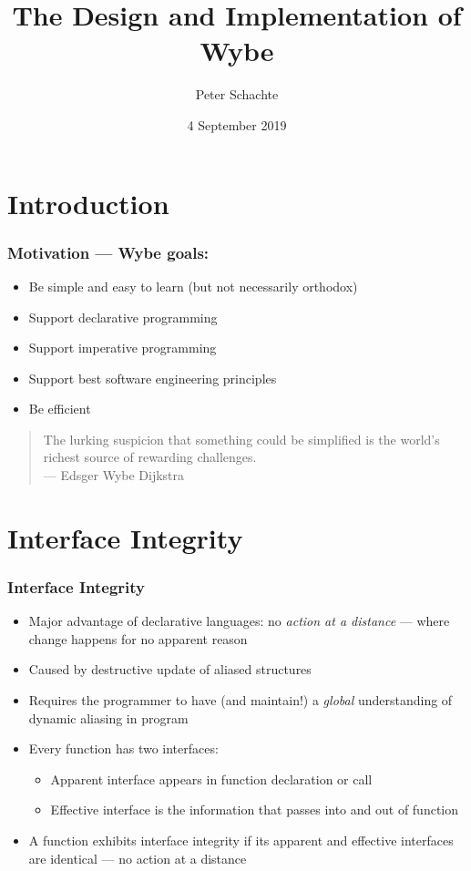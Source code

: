 \documentclass[12pt]{beamer}
\title[Introducing Wybe]{The Design and Implementation of Wybe}
\author[Peter Schachte]
{Peter Schachte}
\institute[Melbourne Uni]{The University of Melbourne \\ School of
  Computing and Information Systems}
\date{4 September 2019}
\begin{document}
\frame{\titlepage}

\section{Introduction}

\begin{frame}[fragile]
\frametitle{Motivation --- Wybe goals:}
\begin{itemize}
\item Be simple and easy to learn (but not necessarily orthodox)
\item Support declarative programming
\item Support imperative programming
\item Support best software engineering principles
\item Be efficient
\end{itemize}
\vspace{2ex}
\begin{quote}
  The lurking suspicion that something could be simplified is the
world's richest source of rewarding challenges. \\
\hspace*{1cm} --- Edsger Wybe Dijkstra
\end{quote}
\end{frame}

\section{Interface Integrity}

\begin{frame}[fragile]
\frametitle{Interface Integrity}
\begin{itemize}
\item Major advantage of declarative languages:  
  no \emph{action at a distance} --- where change happens for no apparent reason
\item Caused by destructive update of aliased structures
\item Requires the programmer to have (and maintain!) a \emph{global}
  understanding of dynamic aliasing in program
\item Every function has two interfaces:
  \begin{itemize}
  \item \alert<2>{Apparent interface} appears in function declaration
    or call
  \item \alert<3>{Effective interface} is the information that passes into and out of function
  \end{itemize}
\item A function exhibits \alert<4>{interface integrity} if its apparent and
effective interfaces are identical --- no action at a distance

\end{itemize}

\end{frame}
\end{document}
